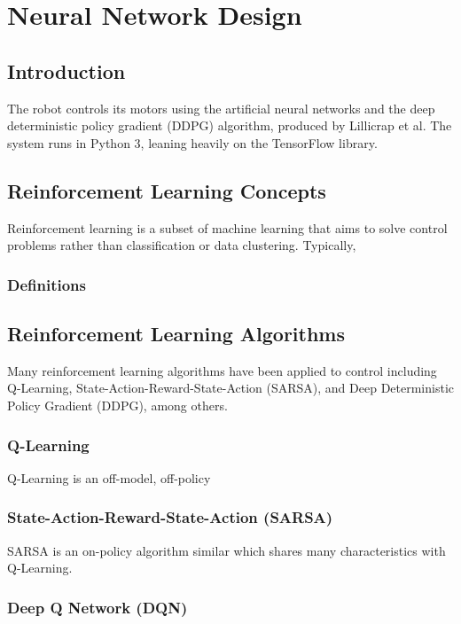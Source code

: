 \chapter{Neural Network Design}
\section{Introduction}
The robot controls its motors using the artificial neural networks and the deep deterministic policy gradient (DDPG) algorithm, produced by Lillicrap et al. The system runs in Python 3, leaning heavily on the TensorFlow library.

\section{Reinforcement Learning Concepts}
Reinforcement learning is a subset of machine learning that aims to solve control problems rather than classification or data clustering. Typically, 

\subsection{Definitions}


\section{Reinforcement Learning Algorithms}
Many reinforcement learning algorithms have been applied to control including Q-Learning, State-Action-Reward-State-Action (SARSA), and Deep Deterministic Policy Gradient (DDPG), among others.

\subsection{Q-Learning}
Q-Learning is an off-model, off-policy 

\subsection{State-Action-Reward-State-Action (SARSA)}
SARSA is an on-policy algorithm similar which shares many characteristics with Q-Learning.

\subsection{Deep Q Network (DQN)}


